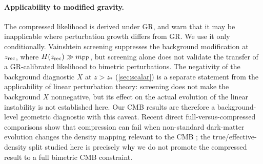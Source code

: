 \paragraph{Applicability to modified gravity.}
The compressed likelihood is derived under GR, and \citet{Planck2015XIV} warn that it may be inapplicable where perturbation growth differs from GR. We use it only conditionally. Vainshtein screening suppresses the background modification at $z_{\rm rec}$, where $H(z_{\rm rec})\gg m_{\mathrm{FP}}$, but screening alone does not validate the transfer of a GR-calibrated likelihood to bimetric perturbations. The negativity of the background diagnostic $X$ at $z>z_*$ (\cref{sec:scalar}) is a separate statement from the applicability of linear perturbation theory: screening does not make the background $X$ nonnegative, but its effect on the actual evolution of the linear instability is not established here. Our CMB results are therefore a background-level geometric diagnostic with this caveat. Recent direct full-versus-compressed comparisons show that compression can fail when non-standard dark-matter evolution changes the density mapping relevant to the CMB \citep{Pedrotti2026}; the true/effective-density split studied here is precisely why we do not promote the compressed result to a full bimetric CMB constraint.

